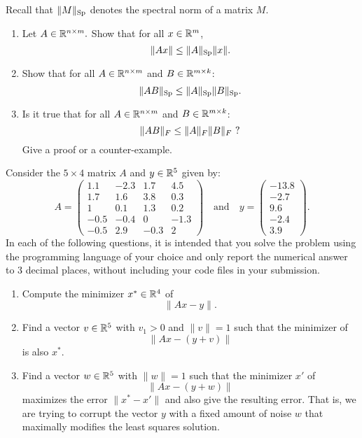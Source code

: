 \documentclass[11pt,nocut]{article}
\begin{document}
\begin{problem}[3 points]
	Recall that $\|M\|_{\rm Sp}$ denotes the spectral norm of a matrix $M$.
	\begin{enumerate}[label=\normalfont(\textbf{\alph*})]
		\item Let $A\in \mathbb{R}^{n \times m}.$ Show that for all $x \in \mathbb{R}^m$,
			$$
			\|Ax\| \leq \|A\|_{\rm Sp} \|x\|.
			$$
		\item Show that for all $A \in \mathbb{R}^{n \times m}$ and $B\in \mathbb{R}^{m \times k}$:
			$$
			\|AB\|_{\rm Sp} \leq \|A\|_{\rm Sp} \|B\|_{\rm Sp}.
			$$
		\item Is it true that for all $A \in \mathbb{R}^{n \times m}$ and $B\in \mathbb{R}^{m \times k}$:
			$$
			\|AB\|_{F} \leq \|A\|_{F} \|B\|_{F} \ {\rm ?}
			$$
			Give a proof or a counter-example.
	\end{enumerate}
\end{problem}

\newpage

\begin{problem}
 Consider the $5 \times 4$ matrix $A$ and $y \in \mathbb{R}^5$ given by:
$$
A=
\begin{pmatrix}
	1.1 & -2.3 & 1.7 &  4.5\\
	1.7  & 1.6  & 3.8  & 0.3 \\
	1  &  0.1 & 1.3&  0.2\\
	-0.5 & -0.4  & 0 &  -1.3 \\
	-0.5  & 2.9 & -0.3 &  2
\end{pmatrix}
\quad \text{and} \quad
y=
\begin{pmatrix}
	-13.8\\
	-2.7 \\
	9.6 \\
	-2.4 \\
	3.9
\end{pmatrix}
.
$$
In each of the following questions, it is intended that you solve the problem using the programming language of your choice and only report the numerical answer to 3 decimal places, without including your code files in your submission.
\begin{enumerate}[label=\normalfont(\textbf{\alph*})]
	\item Compute the minimizer $x^* \in \mathbb{R}^4$ of 
		$$
		\|Ax-y\|.
		$$
	\item Find a vector $v \in\mathbb{R}^5$ with $v_1 > 0$ and $\|v\|=1$ such that the minimizer of 
		$$
		\|Ax - (y+v)\|
		$$
		is also $x^*$.
	\item Find a vector $w \in \mathbb{R}^5$ with $\|w\|=1$ such that the minimizer $x'$ of 
		$$
		\|Ax - (y+w)\|
		$$
		maximizes the error $\|x^* - x'\|$ and also	give the resulting error.
		That is, we are trying to corrupt the vector $y$ with a fixed amount of noise $w$ that maximally modifies the least squares solution.
\end{enumerate}
\end{problem}
\end{document}
